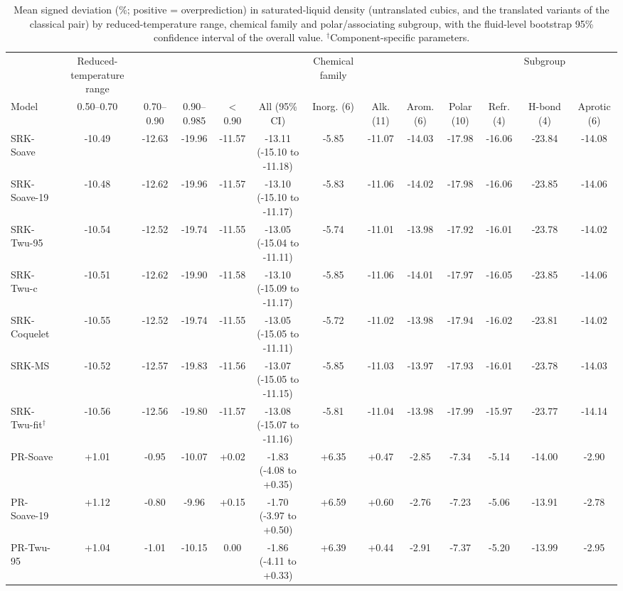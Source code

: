 \begin{table}[H]
\centering
\caption{Mean signed deviation (\%; positive = overprediction) in saturated-liquid density (untranslated cubics, and the translated variants of the classical pair) by reduced-temperature range, chemical family and polar/associating subgroup, with the fluid-level bootstrap 95\% confidence interval of the overall value. $^{\dagger}$Component-specific parameters.}
\label{tab:tabS_signed_rho}
\small
\begin{tabular}{lcccccccccccc}
\toprule
 & Reduced-temperature range &  &  &  &  & Chemical family &  &  &  &  & Subgroup &  \\
Model & 0.50--0.70 & 0.70--0.90 & 0.90--0.985 & < 0.90 & All (95\% CI) & Inorg. (6) & Alk. (11) & Arom. (6) & Polar (10) & Refr. (4) & H-bond (4) & Aprotic (6) \\
\midrule
SRK-Soave & -10.49 & -12.63 & -19.96 & -11.57 & -13.11 (-15.10 to -11.18) & -5.85 & -11.07 & -14.03 & -17.98 & -16.06 & -23.84 & -14.08 \\
SRK-Soave-19 & -10.48 & -12.62 & -19.96 & -11.57 & -13.10 (-15.10 to -11.17) & -5.83 & -11.06 & -14.02 & -17.98 & -16.06 & -23.85 & -14.06 \\
SRK-Twu-95 & -10.54 & -12.52 & -19.74 & -11.55 & -13.05 (-15.04 to -11.11) & -5.74 & -11.01 & -13.98 & -17.92 & -16.01 & -23.78 & -14.02 \\
SRK-Twu-c & -10.51 & -12.62 & -19.90 & -11.58 & -13.10 (-15.09 to -11.17) & -5.85 & -11.06 & -14.01 & -17.97 & -16.05 & -23.85 & -14.06 \\
SRK-Coquelet & -10.55 & -12.52 & -19.74 & -11.55 & -13.05 (-15.05 to -11.11) & -5.72 & -11.02 & -13.98 & -17.94 & -16.02 & -23.81 & -14.02 \\
SRK-MS & -10.52 & -12.57 & -19.83 & -11.56 & -13.07 (-15.05 to -11.15) & -5.85 & -11.03 & -13.97 & -17.93 & -16.01 & -23.78 & -14.03 \\
SRK-Twu-fit$^{\dagger}$ & -10.56 & -12.56 & -19.80 & -11.57 & -13.08 (-15.07 to -11.16) & -5.81 & -11.04 & -13.98 & -17.99 & -15.97 & -23.77 & -14.14 \\
\midrule
PR-Soave & +1.01 & -0.95 & -10.07 & +0.02 & -1.83 (-4.08 to +0.35) & +6.35 & +0.47 & -2.85 & -7.34 & -5.14 & -14.00 & -2.90 \\
PR-Soave-19 & +1.12 & -0.80 & -9.96 & +0.15 & -1.70 (-3.97 to +0.50) & +6.59 & +0.60 & -2.76 & -7.23 & -5.06 & -13.91 & -2.78 \\
PR-Twu-95 & +1.04 & -1.01 & -10.15 & 0.00 & -1.86 (-4.11 to +0.33) & +6.39 & +0.44 & -2.91 & -7.37 & -5.20 & -13.99 & -2.95 \\

\end{tabular}
\end{table}
